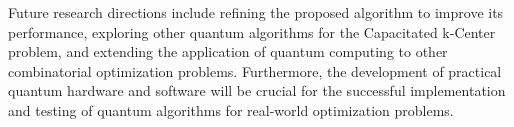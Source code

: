Future research directions include refining the proposed algorithm to improve its performance, exploring other quantum algorithms for the Capacitated k-Center problem, and extending the application of quantum computing to other combinatorial optimization problems. Furthermore, the development of practical quantum hardware and software will be crucial for the successful implementation and testing of quantum algorithms for real-world optimization problems.

\endinput

